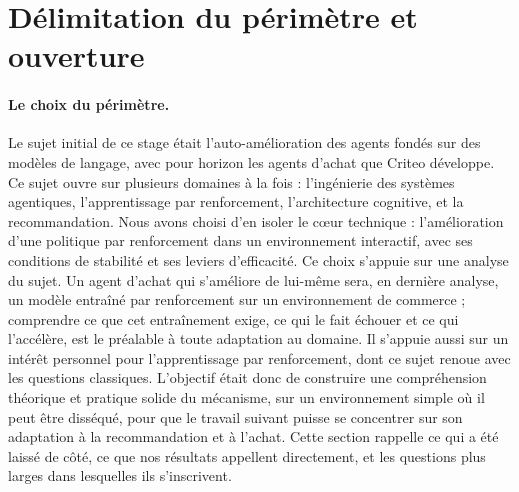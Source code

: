 \documentclass[11pt,a4paper]{article}
\begin{document}



\clearpage
\section{Délimitation du périmètre et ouverture}

\paragraph{Le choix du périmètre.} Le sujet initial de ce stage était l'auto-amélioration des agents fondés sur des modèles de langage, avec pour horizon les agents d'achat que Criteo développe. Ce sujet ouvre sur plusieurs domaines à la fois : l'ingénierie des systèmes agentiques, l'apprentissage par renforcement, l'architecture cognitive, et la recommandation. Nous avons choisi d'en isoler le cœur technique : l'amélioration d'une politique par renforcement dans un environnement interactif, avec ses conditions de stabilité et ses leviers d'efficacité. Ce choix s'appuie sur une analyse du sujet. Un agent d'achat qui s'améliore de lui-même sera, en dernière analyse, un modèle entraîné par renforcement sur un environnement de commerce ; comprendre ce que cet entraînement exige, ce qui le fait échouer et ce qui l'accélère, est le préalable à toute adaptation au domaine. Il s'appuie aussi sur un intérêt personnel pour l'apprentissage par renforcement, dont ce sujet renoue avec les questions classiques. L'objectif était donc de construire une compréhension théorique et pratique solide du mécanisme, sur un environnement simple où il peut être disséqué, pour que le travail suivant puisse se concentrer sur son adaptation à la recommandation et à l'achat. Cette section rappelle ce qui a été laissé de côté, ce que nos résultats appellent directement, et les questions plus larges dans lesquelles ils s'inscrivent.
\end{document}
